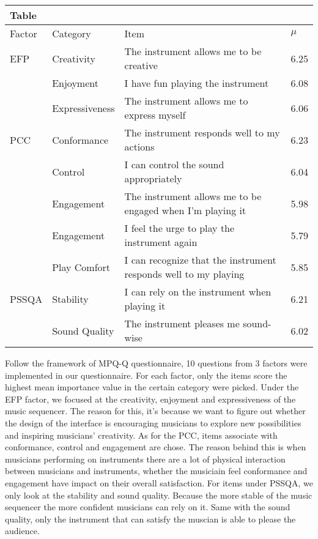 \begin{tabular}{ |p{1.2cm}|p{2.5cm}|p{9.2cm}|p{0.6cm}|}
 \multicolumn{4}{l}{Table} \\
 \hline
 Factor & Category  & Item  & $\mu$ \\
 \hline
 EFP & Creativity & The instrument allows me to be creative & 6.25\\
 & Enjoyment &  I have fun playing the instrument & 6.08\\
 & Expressiveness & The instrument allows me to express myself & 6.06\\
 \hline
 PCC & Conformance & The instrument responds well to my actions & 6.23\\
 & Control & I can control the sound appropriately & 6.04\\
 & Engagement & The instrument allows me to be engaged when I'm playing it & 5.98\\
 & Engagement & I feel the urge to play the instrument again & 5.79\\
 & Play Comfort & I can recognize that the instrument responds well to my playing & 5.85\\
 \hline
 PSSQA & Stability & I can rely on the instrument when playing it & 6.21\\
 & Sound Quality & The instrument pleases me sound-wise & 6.02\\
 \hline
\end{tabular}


Follow the framework of MPQ-Q questionnaire, 10 questions from 3 factors were implemented in our questionnaire. For each factor, only the items score the highest mean importance value in the certain category were picked. Under the EFP factor, we focused at the creativity, enjoyment and expressiveness of the music sequencer. The reason for this, it's because we want to figure out whether the design of the interface is encouraging musicians to explore new possibilities and inspiring musicians' creativity. As for the PCC, items associate with conformance, control and engagement are chose. The reason behind this is when musicians performing on instruments there are a lot of physical interaction between musicians and instruments, whether the musiciain feel conformance and engagement have impact on their overall satisfaction. For items under PSSQA, we only look at the stability and sound quality. Because the more stable of the music sequencer the more confident musicians can rely on it. Same with the sound quality, only the instrument that can satisfy the muscian is able to please the audience.
  
